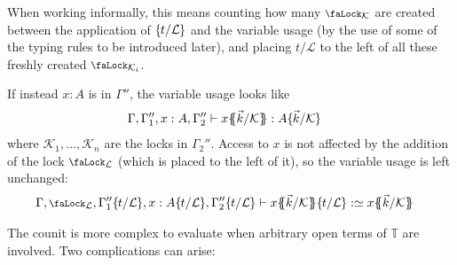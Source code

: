 \documentclass[10pt]{article}
\theoremstyle{definition}
\let\oldequiv\equiv%
\renewcommand{\equiv}{\simeq}
\newcommand{\defeq}{\oldequiv}
\newcommand{\yields}{\vdash}
\newcommand{\lock}{\mathchoice {\scalebox{0.8}{\text{\faLock}}}
  {\scalebox{0.8}{\text{\faLock}}} {\scalebox{0.5}{\text{\faLock}}}
  {\scalebox{0.4}{\text{\faLock}}} }
\newcommand{\Tiny}{\mathbb{T}}
\newcommand{\lockn}[1]{\mathcal{#1}}
\newcommand{\ctxlocke}[1]{\lock_{#1}}
\newcommand{\ctxlock}[1]{\ctxlocke{\lockn{#1}}}
\newcommand{\stubra}[1]{\{\!\!\{ #1 \}\!\!\}}
\newcommand{\admbra}[1]{\{\mkern-1mu #1 \mkern-0.5mu\}}
\newcommand{\subkeysep}[2]{#1/#2}
\newcommand{\subkeyo}[2]{\subkeysep{#1}{\lockn{#2}}}
\newcommand{\subkey}[2]{\admbra{\subkeyo{#1}{#2}}}
\begin{document}
When working informally, this means counting how many
$\ctxlocke{\lockn{K}}$ are created between the application of
$\subkey{t}{L}$ and the variable usage (by the use of some of the
typing rules to be introduced later), and placing $\subkeyo{t}{L}$
to the left of all these freshly created $\ctxlocke{\lockn{K}_i}$.

If instead $x : A$ is in $\Gamma''$, the variable usage looks like
\begin{align*}
  \Gamma, \Gamma_1'', x : A, \Gamma_2''
  &\yields x \stubra{\subkeyo{\vec{k}}{K}} : A\subkey{\vec{k}}{K}
\end{align*}
where $\lockn{K}_{1}, \dots, \lockn{K}_n$ are the locks in
$\Gamma_2''$. Access to $x$ is not affected by the addition of the
lock $\ctxlock{L}$ (which is placed to the left of it), so the
variable usage is left unchanged:
\begin{align*}
  \Gamma, \ctxlock{L}, \Gamma_1''\subkey{t}{L}, x : A\subkey{t}{L}, \Gamma_2''\subkey{t}{L}
  &\yields x\stubra{\subkeyo{\vec{k}}{K}} \subkey{t}{L}
    :\defeq x\stubra{\subkeyo{\vec{k}}{K}} 
\end{align*}

The counit is more complex to evaluate when arbitrary open terms of
$\Tiny$ are involved. Two complications can arise:
\end{document}
